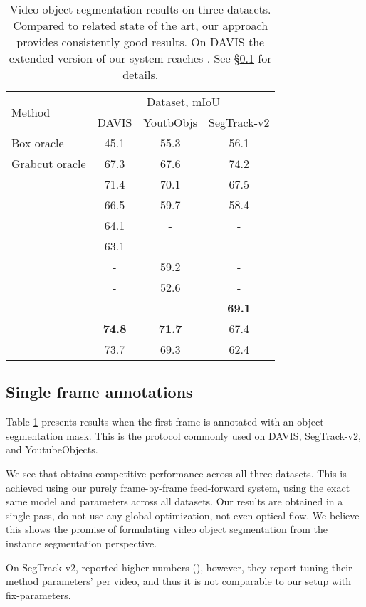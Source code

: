 \documentclass[10pt,twocolumn,letterpaper]{article}
\newcommand{\segtrack}{SegTrack-v2}
\begin{document}
\begin{table}
\begin{centering}
\begingroup
\begin{tabular}{l|ccc}
\multirow{2}{*}{Method} & \multicolumn{3}{c}{Dataset, mIoU}\tabularnewline
	& {\footnotesize{}DAVIS} & {\footnotesize{}YoutbObjs} & {\footnotesize{}\segtrack{}}\tabularnewline
\hline
\hline
Box oracle  & 45.1  & 55.3 & 56.1 \tabularnewline
Grabcut oracle & 67.3 & 67.6 & 74.2\tabularnewline
\hline
 \cite{Tsai2016Cvpr} & 71.4 & 70.1 & 67.5\tabularnewline
 \cite{Maerki2016Cvpr} & 66.5 & 59.7 & 58.4\tabularnewline
  \cite{Faktor2014Bmvc} & 64.1 & - & -\tabularnewline
 \cite{Perazzi2015Iccv} & 63.1 & - & -\tabularnewline
 \cite{Wang2016Accv} & - & 59.2 & -\tabularnewline
 \cite{Zhang2015CvprObjectSegmentation} & - & 52.6 & -\tabularnewline
 \cite{Xiao2016Cvpr}  & -  & - & \textbf{69.1} \tabularnewline
\hline
\hspace*{1.5em} & \textbf{74.8} & \textbf{71.7} & 67.4\tabularnewline
 & 73.7  & 69.3 & 62.4\tabularnewline
\end{tabular}\endgroup
\par\end{centering}
\caption{\label{tab:VOS-results}Video object segmentation results on three
datasets. Compared to related state of the art, our approach provides
consistently good results. On DAVIS the extended version of our system  reaches . See \S\ref{sec:single-frame-results} for details.}
\end{table}

\subsection{Single frame annotations}
\label{sec:single-frame-results}

Table \ref{tab:VOS-results} presents results when the first frame is annotated with an object segmentation mask. This is the protocol commonly used on DAVIS, \segtrack{}, and YoutubeObjects.

We see that  obtains competitive performance across all three datasets. This is achieved using our purely frame-by-frame feed-forward system, using the exact same model and parameters across all datasets.
Our  results are obtained in a single pass, do not use any global optimization, not even optical flow.
We believe this shows the promise of formulating video object segmentation from the instance segmentation perspective.

On \segtrack{},  \cite{Wen2015Cvpr} reported higher numbers (), however, they report tuning their method parameters' per video, and thus it is not comparable to our setup with fix-parameters.
\end{document}
